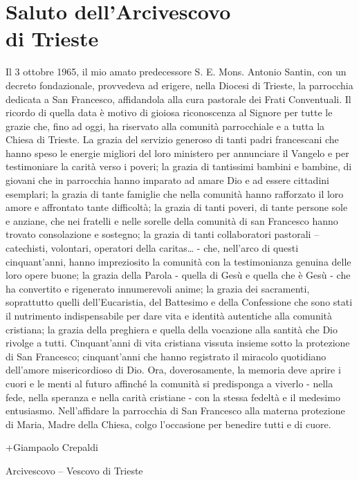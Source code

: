 \chapter*{Saluto dell’Arcivescovo\\ di Trieste}
Il 3 ottobre 1965, il mio amato predecessore S. E. Mons. Antonio Santin, con un decreto  
fondazionale, provvedeva ad erigere, nella Diocesi di Trieste, la parrocchia dedicata a San 
Francesco, affidandola alla cura pastorale dei Frati Conventuali. Il ricordo di quella data è motivo di 
gioiosa riconoscenza al Signore per tutte le grazie che, fino ad oggi, ha riservato alla comunità 
parrocchiale e a tutta la Chiesa di Trieste. La grazia del servizio generoso di tanti padri francescani 
che hanno speso le energie migliori del loro ministero per annunciare il Vangelo e per testimoniare 
la carità verso i poveri; la grazia di tantissimi bambini e bambine, di giovani che in parrocchia 
hanno imparato ad amare Dio e ad essere cittadini esemplari; la grazia di tante famiglie che nella 
comunità hanno rafforzato il loro amore e affrontato tante difficoltà; la grazia di tanti poveri, di 
tante persone sole e anziane, che nei fratelli e nelle sorelle della comunità di  san Francesco  hanno 
trovato consolazione e sostegno; la grazia di tanti collaboratori pastorali – catechisti, volontari, 
operatori della caritas… - che, nell’arco di questi cinquant’anni, hanno impreziosito la comunità 
con la testimonianza genuina delle loro opere buone; la grazia della Parola - quella di Gesù e quella 
che è Gesù - che ha convertito e rigenerato innumerevoli anime; la grazia dei sacramenti, soprattutto 
quelli dell’Eucaristia, del Battesimo e della Confessione che sono stati il nutrimento indispensabile 
per dare vita e identità autentiche alla comunità cristiana; la grazia della preghiera e quella della 
vocazione alla santità che Dio rivolge a tutti.
Cinquant’anni di vita cristiana vissuta insieme sotto la protezione di San Francesco; 
cinquant’anni che hanno registrato il miracolo quotidiano dell’amore misericordioso di Dio. Ora, 
doverosamente, la memoria deve aprire i cuori e le menti al futuro affinché la comunità si 
predisponga a viverlo - nella fede, nella speranza e nella carità cristiane - con la stessa fedeltà e il 
medesimo entusiasmo.
Nell’affidare la parrocchia di San Francesco alla materna protezione di Maria, Madre della 
Chiesa, colgo l’occasione per benedire tutti e di cuore.
\begin{flushright}
+Giampaolo Crepaldi\par
Arcivescovo – Vescovo di Trieste
\end{flushright}
